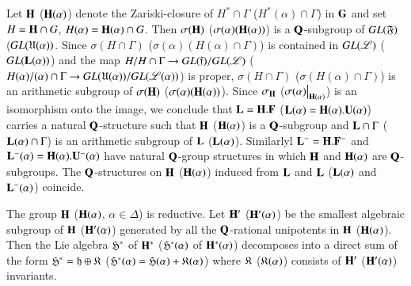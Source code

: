 \subsection{}\label{art9-subsec4.30}
Let $\mathbf{H}$ (\resp $\mathbf{H}(\alpha)$) denote the Zariski-closure of $H^\ast \cap \Gamma$ (\resp $H^\ast(\alpha) \cap \Gamma$) in $\mathbf{G}$ and set $H =\mathbf{H} \cap G$, $H(\alpha) = \mathbf{H} (\alpha) \cap G$. Then $\sigma (\mathbf{H})$ (\resp $\sigma (\alpha) (\mathbf{H} (\alpha))$) is a $\mathbf{Q}$-subgroup of $GL(\mathfrak{F})$ (\resp $GL (\mathfrak{U}(\alpha))$. Since $\sigma (H \cap \Gamma)$ (\resp $\sigma (\alpha) (H(\alpha) \cap \Gamma)$) is contained in $GL (\mathscr{L})$ (\resp $GL (\mathbf{L} (\alpha))$) and the map $H/H \cap \Gamma \to GL (\mathfrak{f})/ GL (\mathscr{L})$ (\resp $H(\alpha)/ (\alpha) \cap \Gamma \to GL (\mathfrak{U} (\alpha))/GL (\mathscr{L} (\alpha))$) is proper, $\sigma (H \cap \Gamma)$ (\resp $\sigma (H (\alpha) \cap \Gamma)$) is an arithmetic subgroup of $\sigma (\mathbf{H})$ (\resp $\sigma (\alpha) (\mathbf{H} (\alpha))$). Since $\sigma_{\mathbf{H}}$ (\resp $\sigma (\alpha) \big|_{\mathbf{H}(\alpha)}$) is an isomorphism onto the image, we conclude that $\mathbf{L} = \mathbf{H}.\mathbf{F}$ (\resp $\mathbf{L} (\alpha) = \mathbf{H} (\alpha). \mathbf{U} (\alpha)$) carries a natural $\mathbf{Q}$-structure such that $\mathbf{H}$ (\resp $\mathbf{H}(\alpha)$) is a $\mathbf{Q}$-subgroup and $\mathbf{L} \cap \Gamma$ (\resp $\mathbf{L} (\alpha) \cap \Gamma$) is an arithmetic subgroup of $\mathbf{L}$ (\resp $\mathbf{L} (\alpha)$). Similarlyl $\mathbf{L}^- = \mathbf{H}. \mathbf{F}^-$ and $\mathbf{L}^-(\alpha) = \mathbf{H} (\alpha). \mathbf{U}^-(\alpha)$ have natural $\mathbf{Q}$-group structures in which $\mathbf{H}$ and $\mathbf{H}(\alpha)$ are $\mathbf{Q}$-subgroups. The $\mathbf{Q}$-structures on $\mathbf{H}$ (\resp $\mathbf{H} (\alpha)$) induced from $\mathbf{L}$ and $\mathbf{L}$ (\resp $\mathbf{L}(\alpha)$ and $\mathbf{L}^-(\alpha)$) coincide.

\begin{lemma}\label{art9-lem4.31}
The group $\mathbf{H}$ (\resp $\mathbf{H}(\alpha)$, $\alpha \in \Delta$) is reductive. Let $\mathbf{H}'$  (\resp $\mathbf{H}'(\alpha)$) be the smallest algebraic subgroup of $\mathbf{H}$ (\resp $\mathbf{H}'(\alpha)$) generated by all the $\mathbf{Q}$-rational unipotents in $\mathbf{H}$ (\resp $\mathbf{H}(\alpha)$). Then the Lie algebra $\mathfrak{H}^\ast$ of $\mathbf{H}^\ast$ (\resp $\mathfrak{H}^\ast(\alpha)$ of $\mathbf{H}^\ast (\alpha)$) decomposes into a direct sum of the form $\mathfrak{H}^\ast = \mathfrak{h} \oplus \mathfrak{K}$ (\resp $\mathfrak{H}^\ast(\alpha)= \mathfrak{H} (\alpha) + \mathfrak{K}(\alpha)$) where  $\mathfrak{K}$ (\resp $\mathfrak{K} (\alpha)$) consists of $\mathbf{H}'$ (\resp $\mathbf{H}'(\alpha)$) invariants. 
\end{lemma}

